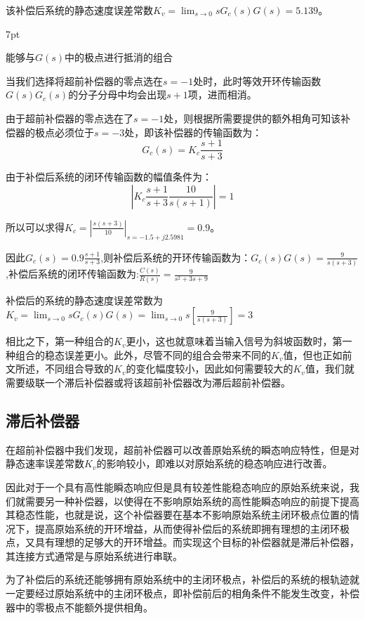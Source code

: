 \documentclass{article}
\numberwithin{equation}{section}
\numberwithin{figure}{section}
\newenvironment{formal}{%
\def\FrameCommand{%
\hspace{1pt}%
{\color{DarkBlue}\vrule width 2pt}%
{\color{formalshade}\vrule width 4pt}%
\colorbox{formalshade}%
}%
\MakeFramed{\advance\hsize-\width\FrameRestore}%
\noindent\hspace{-4.55pt}%
\begin{adjustwidth}{}{7pt}%
\vspace{2pt}\vspace{2pt}%
}
{%
\vspace{2pt}\end{adjustwidth}\endMakeFramed%
}
\begin{document}
该补偿后系统的静态速度误差常数$K_v=\lim_{s\rightarrow 0}sG_c(s)G(s)=5.139$。

\begin{formal}
    能够与$G(s)$中的极点进行抵消的组合
\end{formal}

当我们选择将超前补偿器的零点选在$s=-1$处时，此时等效开环传输函数$G(s)G_c(s)$的分子分母中均会出现$s+1$项，进而相消。

由于超前补偿器的零点选在了$s=-1$处，则根据所需要提供的额外相角可知该补偿器的极点必须位于$s=-3$处，即该补偿器的传输函数为：
\begin{equation}
    G_c(s)=K_c\frac{s+1}{s+3}
\end{equation}

由于补偿后系统的闭环传输函数的幅值条件为：
\begin{equation}
    |K_c\frac{s+1}{s+3}\frac{10}{s(s+1)}|=1
\end{equation}

所以可以求得$K_c=|\frac{s(s+3)}{10}|_{s=-1.5+j2.5981}=0.9$。

因此$G_c(s)=0.9\frac{s+1}{s+3}$,则补偿后系统的开环传输函数为：$G_c(s)G(s)=\frac{9}{s(s+3)}$,补偿后系统的闭环传输函数为:$\frac{C(s)}{R(s)}=\frac{9}{s^2+3s+9}$

补偿后的系统的静态速度误差常数为$K_v=\lim_{s\rightarrow 0}sG_c(s)G(s)=\lim_{s\rightarrow 0}s[\frac{9}{s(s+3)}]=3$

相比之下，第一种组合的$K_v$更小，这也就意味着当输入信号为斜坡函数时，第一种组合的稳态误差更小。此外，尽管不同的组合会带来不同的$K_v$值，但也正如前文所述，不同组合导致的$K_v$的变化幅度较小，因此如何需要较大的$K_v$值，我们就需要级联一个滞后补偿器或将该超前补偿器改为滞后超前补偿器。

\subsection{滞后补偿器}
在超前补偿器中我们发现，超前补偿器可以改善原始系统的瞬态响应特性，但是对静态速率误差常数$K_v$的影响较小，即难以对原始系统的稳态响应进行改善。

因此对于一个具有高性能瞬态响应但是具有较差性能稳态响应的原始系统来说，我们就需要另一种补偿器，以使得在不影响原始系统的高性能瞬态响应的前提下提高其稳态性能，也就是说，这个补偿器要在基本不影响原始系统主闭环极点位置的情况下，提高原始系统的开环增益，从而使得补偿后的系统即拥有理想的主闭环极点，又具有理想的足够大的开环增益。而实现这个目标的补偿器就是滞后补偿器，其连接方式通常是与原始系统进行串联。

为了补偿后的系统还能够拥有原始系统中的主闭环极点，补偿后的系统的根轨迹就一定要经过原始系统中的主闭环极点，即补偿前后的相角条件不能发生改变，补偿器中的零极点不能额外提供相角。
\end{document}
